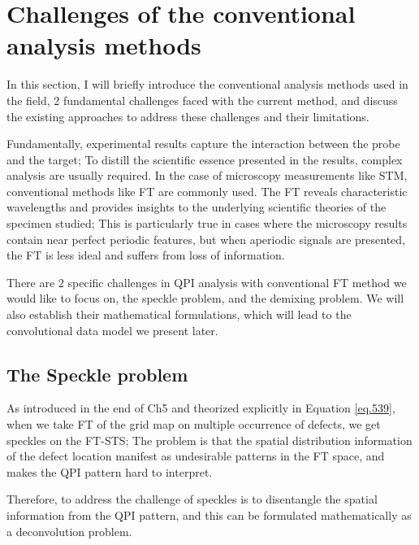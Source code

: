 \section{Challenges of the conventional analysis methods}
In this section, I will briefly introduce the conventional analysis methods used in the field, 2 fundamental challenges faced with the current method, and discuss the existing approaches to address these challenges and their limitations. 

Fundamentally, experimental results capture the interaction between the probe and the target; To distill the scientific essence presented in the results, complex analysis are usually required. In the case of microscopy measurements like STM, conventional methods like \ac{FT} are commonly used. %
The \ac{FT} reveals characteristic wavelengths and provides insights to the underlying scientific theories of the specimen studied; This is particularly true in cases where the microscopy results contain near perfect periodic features, but when aperiodic signals are presented, the \ac{FT} is less ideal and suffers from loss of information. 

There are 2 specific challenges in QPI analysis with conventional \ac{FT} method we would like to focus on, the speckle problem, and the demixing problem. We will also establish their mathematical formulations, which will lead to the convolutional data model we present later. 

\subsection{The Speckle problem}
As introduced in the end of Ch5 and theorized explicitly in Equation \ref{eq.539}, when we take \ac{FT} of the grid map on multiple occurrence of defects, we get speckles on the \ac{FT-STS}; The problem is that the spatial distribution information of the defect location manifest as undesirable patterns in the \ac{FT} space, and makes the QPI pattern hard to interpret.

Therefore, to address the challenge of speckles is to disentangle the spatial information from the \ac{QPI} pattern, and this can be formulated mathematically as a deconvolution problem. 

